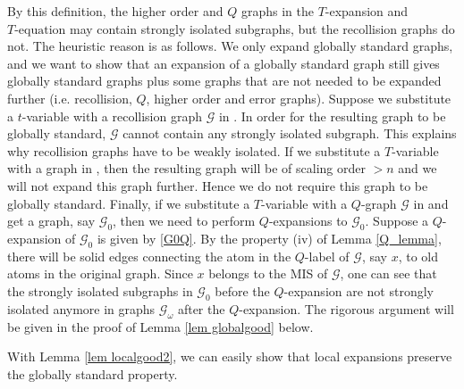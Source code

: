 \documentclass{article}
\newcommand{\1}{\mathds{1}}
\numberwithin{equation}{section}
\renewcommand{\cal}{\mathcal}
\theoremstyle{plain} %
\theoremstyle{remark}
\newcommand{\cor}{\color{red}}
\newcommand{\incomp}{{\text{$T$-equation}}}
\newcommand{\PT}{\mathcal R_T}
\newcommand{\QT}{\mathcal Q_T}
\newcommand{\AT}{\mathcal A_T}
\newcommand{\hty}[1]{{\cor (ht: #1) }}
\begin{document}
By this definition, the higher order and $Q$ graphs in the $T$-expansion and $\incomp$ may contain strongly isolated subgraphs, but the recollision graphs do not. The heuristic reason is as follows. We only expand globally standard graphs, and we want to show that an expansion of a globally standard graph still gives globally standard graphs plus some graphs that are not needed to be expanded further (i.e. recollision, $Q$, higher order and error graphs). Suppose we substitute a $t$-variable with a recollision graph $\cal G$ in \smash{$\PT^{(n-1)}$}. In order for the resulting graph to be globally standard, $\cal G$ cannot contain any strongly isolated subgraph. %
This explains why recollision graphs have to be weakly isolated. If we substitute a $T$-variable with a graph in \smash{$\AT^{(n-1)}$}, then the resulting graph will be of scaling order $>n$ and we will not expand this graph further. Hence we do not require this graph to be globally standard. Finally, if we substitute a $T$-variable with a $Q$-graph $\cal G$ in \smash{$\QT^{(n-1)}$} and get a graph, say $\cal G_0$, then we need to perform $Q$-expansions to $\cal G_0$. Suppose a $Q$-expansion of $\cal G_0$ is given by \eqref{G0Q}. By the property (iv) of Lemma \ref{Q_lemma}, there will be solid edges connecting the atom in the $Q$-label of $\cal G$, say $x$, to old atoms in the original graph. Since $x$ belongs to the MIS of $\cal G$, one can see that the strongly isolated subgraphs in $\cal G_0$ before the $Q$-expansion are not strongly isolated anymore in graphs $\cal G_\omega$ after the $Q$-expansion. The rigorous argument will be given in the proof of Lemma \ref{lem globalgood} below.


With Lemma \ref{lem localgood2}, we can easily show that local expansions preserve the globally standard property. %
\end{document}
